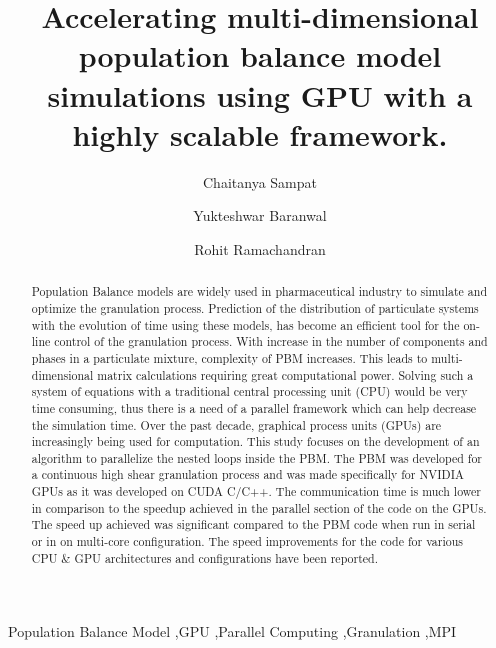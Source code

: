 \documentclass[preprint,10pt,authoryear,review]{elsarticle}
\begin{document}
\begin{frontmatter}
\title{Accelerating multi-dimensional population balance model simulations using GPU with a highly scalable framework.}


\author[label1]{Chaitanya Sampat}
\author[label1]{Yukteshwar Baranwal}
\address[label1]{Chemical and Biochemical Engineering, Rutgers University, Piscataway, NJ, USA - 08854}
\author[label1]{Rohit Ramachandran}

\begin{abstract}
Population Balance models are widely used in pharmaceutical industry to simulate
and optimize the granulation process. Prediction of the distribution of  
particulate systems with the evolution of time using these models, has become an 
efficient tool for the on-line control of the granulation process. 
With increase in the number of components and phases in a particulate mixture, 
complexity of PBM increases. This leads to multi-dimensional matrix calculations 
requiring great computational power. Solving such a system of equations with a traditional 
central processing unit (CPU) would be very time consuming, thus there is a 
need of a parallel framework which can help decrease the simulation time. 
Over the past decade, graphical process units (GPUs) are increasingly being 
used for computation. This study focuses on the development of an algorithm to 
parallelize the nested loops inside the PBM. 
The PBM was developed for a continuous high shear granulation process and was made 
specifically for NVIDIA GPUs as it was developed on CUDA C/C++. The communication 
time is much lower in comparison to the speedup achieved in the parallel section 
of the code on the GPUs. The speed up achieved was significant compared to the PBM 
code when run in serial or in on multi-core configuration. The speed improvements 
for the code for various CPU \& GPU architectures and configurations have 
been reported. 
\end{abstract}

\begin{keyword}
Population Balance Model \sep GPU \sep Parallel Computing \sep Granulation \sep MPI
\end{keyword}

\end{frontmatter}
\end{document}
